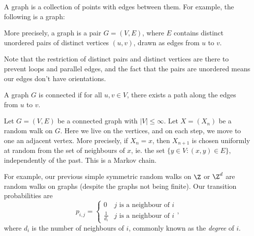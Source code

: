 \documentclass[a4paper]{article}
\begin{document}
\begin{eg}
  A graph is a collection of points with edges between them. For example, the following is a graph:
  \begin{center}
  \end{center}
  More precisely, a graph is a pair $G = (V, E)$, where $E$ contains distinct unordered pairs of distinct vertices $(u, v)$, drawn as edges from $u$ to $v$.

  Note that the restriction of distinct pairs and distinct vertices are there to prevent loops and parallel edges, and the fact that the pairs are unordered means our edges don't have orientations.

  A graph $G$ is connected if for all $u, v \in V$, there exists a path along the edges from $u$ to $v$.

  Let $G = (V, E)$ be a connected graph with $|V| \leq \infty$. Let $X = (X_n)$ be a random walk on $G$. Here we live on the vertices, and on each step, we move to one an adjacent vertex. More precisely, if $X_n = x$, then $X_{n + 1}$ is chosen uniformly at random from the set of neighbours of $x$, ie. the set $\{y \in V: (x, y) \in E\}$, independently of the past. This is a Markov chain.

  For example, our previous simple symmetric random walks on $\Z$ or $\Z^d$ are random walks on graphs (despite the graphs not being finite). Our transition probabilities are
  \[
    p_{i, j} =
    \begin{cases}
      0 & j\text{ is a neighbour of }i\\
      \frac{1}{d_i} & j\text{ is a neighbour of }i
    \end{cases},
  \]
  where $d_i$ is the number of neighbours of $i$, commonly known as the \emph{degree} of $i$.


\end{eg}
\end{document}
